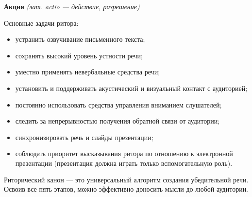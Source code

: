 \textbf{Акция} \textit{(лат. actio — действие, разрешение)}

Основные задачи ритора:
\begin{itemize}
    \item устранить озвучивание письменного текста;
    \item сохранять высокий уровень устности речи; 
    \item уместно применять невербальные средства речи;
    \item установить и поддерживать акустический и визуальный контакт с аудиторией; 
    \item постоянно использовать средства управления вниманием слушателей;
    \item следить за непрерывностью получения обратной связи от аудитории; 
    \item синхронизировать речь и слайды презентации;
    \item соблюдать приоритет высказывания ритора по отношению к электронной презентации (презентация должна играть только вспомогательную роль). 
\end{itemize}
Риторический канон — это универсальный алгоритм создания убедительной речи. Освоив все пять этапов, можно эффективно доносить мысли до любой аудитории. 
